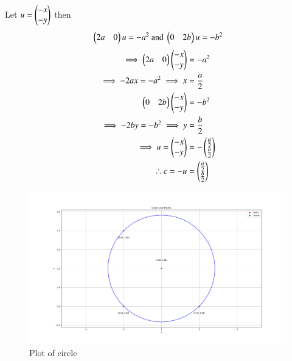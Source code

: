 \documentclass[journal]{IEEEtran}
\begin{document}
Let $u=\begin{pmatrix}-x\\-y\end{pmatrix}$ then
\begin{align}
    \begin{pmatrix}2a&0\end{pmatrix}u=-a^2\text{ and }\begin{pmatrix}0&2b\end{pmatrix}u&=-b^2\\ 
\end{align}
\begin{align}
    \implies\begin{pmatrix}2a&0\end{pmatrix}\begin{pmatrix}-x\\-y\end{pmatrix}&=-a^2\\
    \implies-2ax=-a^2\implies x&=\frac{a}{2}\\
    \begin{pmatrix}0&2b\end{pmatrix}\begin{pmatrix}-x\\-y\end{pmatrix}&=-b^2\\
    \implies-2by=-b^2\implies y&=\frac{b}{2}\\
    \implies u=\begin{pmatrix}-x\\-y\end{pmatrix}&=-\begin{pmatrix}\frac{a}{2}\\ \frac{b}{2}\end{pmatrix}\\
    \therefore c=-u&=\begin{pmatrix}\frac{a}{2}\\ \frac{b}{2}\end{pmatrix}
\end{align}
\begin{figure}[h!]
   \centering
   \includegraphics[width=0.7\linewidth]{figs/Figure_1.png}
   \caption{Plot of circle  }
   \label{stemplot}
\end{figure}
\end{document}
